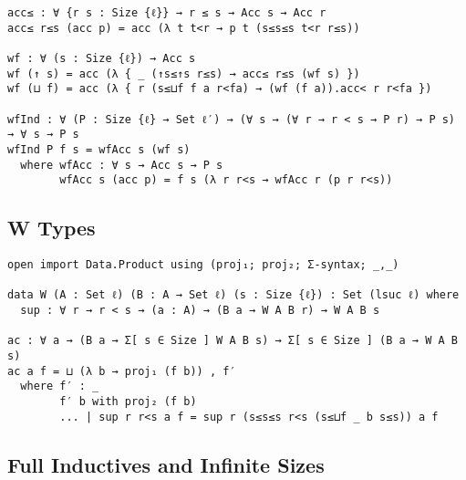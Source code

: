 \begin{singlespace}
\begin{verbatim}
acc≤ : ∀ {r s : Size {ℓ}} → r ≤ s → Acc s → Acc r
acc≤ r≤s (acc p) = acc (λ t t<r → p t (s≤s≤s t<r r≤s))

wf : ∀ (s : Size {ℓ}) → Acc s
wf (↑ s) = acc (λ { _ (↑s≤↑s r≤s) → acc≤ r≤s (wf s) })
wf (⊔ f) = acc (λ { r (s≤⊔f f a r<fa) → (wf (f a)).acc< r r<fa })

wfInd : ∀ (P : Size {ℓ} → Set ℓ′) → (∀ s → (∀ r → r < s → P r) → P s) → ∀ s → P s
wfInd P f s = wfAcc s (wf s)
  where wfAcc : ∀ s → Acc s → P s
        wfAcc s (acc p) = f s (λ r r<s → wfAcc r (p r r<s))
\end{verbatim}
\end{singlespace}

\subsection{W Types} \label{app:mechanization:agda:W}

\begin{singlespace}
\begin{verbatim}
open import Data.Product using (proj₁; proj₂; Σ-syntax; _,_)

data W (A : Set ℓ) (B : A → Set ℓ) (s : Size {ℓ}) : Set (lsuc ℓ) where
  sup : ∀ r → r < s → (a : A) → (B a → W A B r) → W A B s

ac : ∀ a → (B a → Σ[ s ∈ Size ] W A B s) → Σ[ s ∈ Size ] (B a → W A B s)
ac a f = ⊔ (λ b → proj₁ (f b)) , f′
  where f′ : _
        f′ b with proj₂ (f b)
        ... | sup r r<s a f = sup r (s≤s≤s r<s (s≤⊔f _ b s≤s)) a f
\end{verbatim}
\end{singlespace}

\subsection{Full Inductives and Infinite Sizes}

